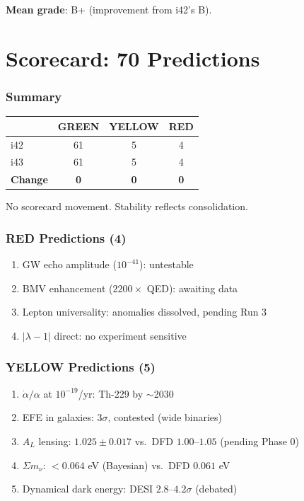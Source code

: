 \documentclass[11pt,a4paper]{article}
\newcommand{\GREEN}{\textcolor{dfdgreen}{\textbf{GREEN}}}
\newcommand{\YELLOW}{\textcolor{dfdyellow}{\textbf{YELLOW}}}
\newcommand{\RED}{\textcolor{dfdred}{\textbf{RED}}}
\begin{document}
\textbf{Mean grade}: B+ (improvement from i42's B).


\part{Scorecard: 70 Predictions}

\section{Summary}

\begin{center}
\begin{tabular}{lccc}
\toprule
& \textbf{\GREEN} & \textbf{\YELLOW} & \textbf{\RED} \\
\midrule
i42 & 61 & 5 & 4 \\
i43 & 61 & 5 & 4 \\
\textbf{Change} & \textbf{0} & \textbf{0} & \textbf{0} \\
\bottomrule
\end{tabular}
\end{center}

No scorecard movement. Stability reflects consolidation.

\section{RED Predictions (4)}

\begin{enumerate}
\item GW echo amplitude ($10^{-41}$): untestable
\item BMV enhancement ($2200\times$ QED): awaiting data
\item Lepton universality: anomalies dissolved, pending Run 3
\item $|\lambda-1|$ direct: no experiment sensitive
\end{enumerate}

\section{YELLOW Predictions (5)}

\begin{enumerate}
\item $\dot{\alpha}/\alpha$ at $10^{-19}$/yr: Th-229 by $\sim$2030
\item EFE in galaxies: $3\sigma$, contested (wide binaries)
\item $A_L$ lensing: $1.025 \pm 0.017$ vs.\ DFD $1.00$--$1.05$ (pending Phase 0)
\item $\Sigma m_\nu$: $< 0.064$ eV (Bayesian) vs.\ DFD $0.061$ eV
\item Dynamical dark energy: DESI $2.8$--$4.2\sigma$ (debated)
\end{enumerate}
\end{document}
